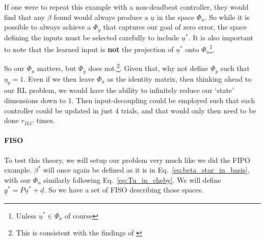 If one were to repeat this example with a non-deadbeat controller, they would find that any $\beta$ found would always produce a $\underline{u}$ in the space $\Phi_u$. So while it is possible to always achieve a $\Phi_y$ that captures our goal of zero error, the space defining the inputs must be selected carefully to include $\underline{u}^\ast$. It is also important to note that the learned input is \textbf{not} the projection of $\underline{u}^\ast$ onto $\Phi_u$\footnote{Unless $\underline{u}^\ast \in \Phi_u$ of course}.

So our $\Phi_u$ matters, but $\Phi_y$ does not.\footnote{This is consistent with the findings of \cite{PhanFrueh1996}}. Given that, why not define $\Phi_y$ such that $\eta_y = 1$. Even if we then leave $\Phi_u$ as the identity matrix, then thinking ahead to our RL problem, we would have the ability to infinitely reduce our `state' dimensions down to $1$. Then input-decoupling could be employed such that each controller could be updated in just $4$ trials, and that would only then need to be done $r_{ILC}$ times. 

\FloatBarrier\paragraph{FISO}
To test this theory, we will setup our problem very much like we did the FIPO example. $\beta^\ast$ will once again be defined as it is in Eq.~\ref{eq:beta_star_in_basis}, with our $\Phi_u$ similarly following Eq.~\ref{eq:Tu_in_cheby}. We will define $\underline{y}^\ast = P\underline{u}^\ast + \underline{d}$. So we have a set of \ac{FISO} describing those spaces.

